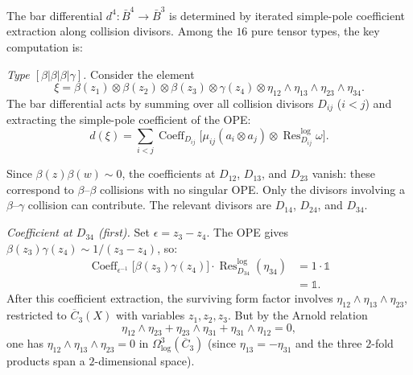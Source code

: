 \begin{computation}
\label{comp:betagamma-degree4}
The bar differential $d^4: \bar{B}^4 \to \bar{B}^3$ is determined by
iterated simple-pole coefficient extraction along collision divisors.
Among the $16$ pure tensor types, the key computation is:

\emph{Type $[\beta|\beta|\beta|\gamma]$.}
Consider the element
\begin{equation}\label{eq:bbbg-element}
\xi = \beta(z_1) \otimes \beta(z_2) \otimes \beta(z_3) \otimes
\gamma(z_4) \otimes \eta_{12} \wedge \eta_{13} \wedge \eta_{23}
\wedge \eta_{34}.
\end{equation}
The bar differential acts by summing over all collision divisors $D_{ij}$
($i < j$) and extracting the simple-pole coefficient of the OPE:
\begin{equation}\label{eq:bbbg-differential}
d(\xi) = \sum_{i < j} \operatorname{Coeff}_{D_{ij}}
\bigl[\mu_{ij}(a_i \otimes a_j) \otimes
\operatorname{Res}^{\log}_{D_{ij}}\omega\bigr].
\end{equation}

Since $\beta(z)\beta(w) \sim 0$, the coefficients at $D_{12}$, $D_{13}$,
and $D_{23}$ vanish: these correspond to $\beta$--$\beta$ collisions
with no singular OPE. Only the divisors involving a $\beta$--$\gamma$
collision can contribute. The relevant divisors are $D_{14}$, $D_{24}$,
and $D_{34}$.

\emph{Coefficient at $D_{34}$ (first).}
Set $\epsilon = z_3 - z_4$. The OPE gives
$\beta(z_3)\gamma(z_4) \sim 1/(z_3 - z_4)$, so:
\begin{align*}
\operatorname{Coeff}_{\epsilon^{-1}}
\bigl[\beta(z_3)\gamma(z_4)\bigr]\cdot
\operatorname{Res}^{\log}_{D_{34}}(\eta_{34})
&=1\cdot\mathbb{1} \\
&= \mathbb{1}.
\end{align*}
After this coefficient extraction, the surviving form factor involves
$\eta_{12} \wedge \eta_{13} \wedge \eta_{23}$, restricted to
$\overline{C}_3(X)$ with variables $z_1, z_2, z_3$. But by the
Arnold relation
\begin{equation}\label{eq:arnold-3pt-recall}
\eta_{12} \wedge \eta_{23} + \eta_{23} \wedge \eta_{31}
+ \eta_{31} \wedge \eta_{12} = 0,
\end{equation}
one has $\eta_{12} \wedge \eta_{13} \wedge \eta_{23} = 0$ in
$\Omega^3_{\log}(\overline{C}_3)$ (since $\eta_{13} = -\eta_{31}$
and the three $2$-fold products span a $2$-dimensional space).


\end{computation}

